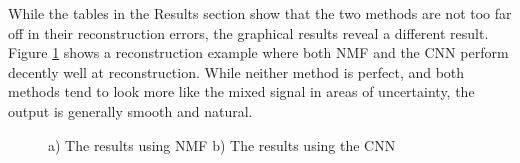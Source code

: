 \documentclass[12pt,chapterheads]{ucsd}
\begin{document}
While the tables in the Results section show that the two methods are not too far off in their reconstruction errors, the graphical results reveal a different result. Figure \ref{fig:sim_res} shows a reconstruction example where both NMF and the CNN perform decently well at reconstruction. While neither method is perfect, and both methods tend to look more like the mixed signal in areas of uncertainty, the output is generally smooth and natural.

\begin{figure}[h]
    \begin{minipage}{.5\linewidth}
        \centering
    \end{minipage}%
    \begin{minipage}{.5\linewidth}
        \centering
    \end{minipage}
    \caption{ a) The results using NMF b) The results using the CNN}
    \label{fig:sim_res}
\end{figure}
\end{document}

